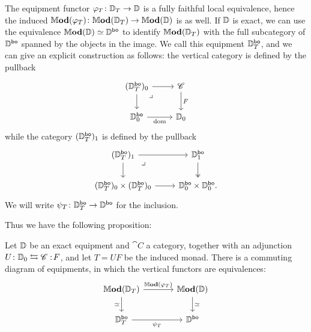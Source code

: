 \documentclass[12pt,oneside,article,draft]{memoir}
\begin{document}
The equipment functor $\varphi_T\colon\mathbb{D}_T\to\mathbb{D}$ is a fully faithful local equivalence,
hence the induced $\mathbb{M}\mathbf{od}(\varphi_T)\colon\mathbb{M}\mathbf{od}(\mathbb{D}_T)\to\mathbb{M}\mathbf{od}(\mathbb{D})$ is as well. If
$\mathbb{D}$ is exact, we can use the equivalence $\mathbb{M}\mathbf{od}(\mathbb{D})\simeq\mathbb{D}^{\mathsf{bo}}$ to identify
$\mathbb{M}\mathbf{od}(\mathbb{D}_T)$ with the full subcategory of $\mathbb{D}^{\mathsf{bo}}$ spanned by the objects in the
image. We call this equipment $\mathbb{D}_T^{\mathsf{bo}}$, and we can give an explicit construction as
follows: the vertical category is defined by the pullback
\begin{equation*}
   \begin{tikzcd}
      (\dcat{D}_T^{\bo})_0 \ar[r] \ar[dr,phantom,"\lrcorner" very near start] \ar[d]
         & \cat{C} \ar[d,"F"] \\
      \dcat{D}_0^{\bo} \ar[r,"\dom"']
         & \dcat{D}_0
   \end{tikzcd}
\end{equation*}
while the category $(\mathbb{D}_T^{\mathsf{bo}})_1$ is defined by the pullback
\begin{equation*}
   \begin{tikzcd}
      (\dcat{D}_T^{\bo})_1 \ar[r] \ar[dr,phantom,"\lrcorner" very near start] \ar[d]
         & \dcat{D}_1^{\bo} \ar[d,two heads] \\
      (\dcat{D}_T^{\bo})_0\times(\dcat{D}_T^{\bo})_0 \ar[r]
         & \dcat{D}_0^{\bo}\times\dcat{D}_0^{\bo}.
   \end{tikzcd}
\end{equation*}
We will write $\psi_T\colon\mathbb{D}_T^{\mathsf{bo}}\to\mathbb{D}^{\mathsf{bo}}$ for the inclusion.

Thus we have the following proposition:

\begin{proposition}\label{prop:object-free_Mod_bo}
   Let $\mathbb{D}$ be an exact equipment and $\cat{C}$ a category, together with an adjunction
   $U\colon\mathbb{D}_0\leftrightarrows\mathscr{C}:\!F$, and let $T=UF$ be the induced monad.  There is a
   commuting diagram of equipments, in which the vertical functors are equivalences:
   \begin{equation*}
      \begin{tikzcd}[column sep=large]
         \dMod(\dcat{D}_T) \ar[r,"\dMod(\varphi_T)"] \ar[d,"\equiv"']
            & \dMod(\dcat{D}) \ar[d,"\equiv"] \\
         \dcat{D}_T^{\bo} \ar[r,"\psi_T"'] & \dcat{D}^{\bo}
      \end{tikzcd}
   \end{equation*}
\end{proposition}
\end{document}
